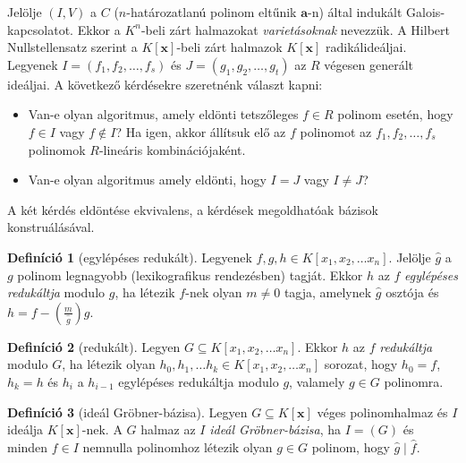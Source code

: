 \documentclass[%
	DIV=15,appendixprefix]{scrreprt}
\theoremstyle{definition}
\newtheorem*{defin}{Definíció}
\theoremstyle{remark}
\begin{document}
Jelölje $ \left( I,{} V \right) $ a $ C $ ($ n $-határozatlanú polinom eltűnik
$ \mathbf{ a } $-n) által indukált Galois-kapcsolatot. Ekkor a $ K^{ n } $-beli zárt halmazokat
\emph{varietásoknak} nevezzük. A Hilbert Nullstellensatz szerint a $ K \left[ \mathbf{ x }
\right] $-beli zárt halmazok $ K \left[ \mathbf{ x } \right] $ radikálideáljai.
%
Legyenek $ I = \left( f_{ 1 },{} f_{ 2 },{} \ldots,{} f_{ s } \right) $ és $ J = \left( g_{ 1 },{}
g_{ 2 },{} \ldots,{} g_{ t } \right) $ az $ R $ végesen generált ideáljai. A következő kérdésekre
szeretnénk választ kapni:
\begin{itemize}
	\item Van-e olyan algoritmus, amely eldönti tetszőleges $ f \in R $ polinom esetén, hogy $ f \in
		I $ vagy $ f \not\in I $? Ha igen, akkor állítsuk elő az $ f $ polinomot az $ f_{ 1 },{}
		f_{ 2 },{} \ldots,{} f_{ s }$ polinomok $ R $-lineáris kombinációjaként.
	\item Van-e olyan algoritmus amely eldönti, hogy $ I = J $ vagy $ I \neq J $?
\end{itemize}
A két kérdés eldöntése ekvivalens, a kérdések megoldhatóak  bázisok konstruálásával.
\begin{defin}[egylépéses redukált]
	Legyenek $ f,{} g,{} h \in K \left[ x_{ 1 },{} x_{ 2 },{} \ldots x_{ n } \right] $. Jelölje
	$ \hat{ g } $ a $g$ polinom legnagyobb (lexikografikus rendezésben) tagját. Ekkor $ h $ az $ f $
	\emph{egylépéses redukáltja} modulo $ g $, ha létezik $ f $-nek olyan $ m \neq 0 $ tagja,
	amelynek $ \hat{ g } $ osztója és $ h = f - \left( \frac{ m }{ \hat{ g } } \right)  g $.
\end{defin}
\begin{defin}[redukált]
	Legyen $ G \subseteq K \left[ x_{ 1 },{} x_{ 2 },{} \ldots x_{ n } \right] $. Ekkor $ h $ az
	$ f $ \emph{redukáltja} modulo $ G $, ha létezik olyan $ h_{ 0 },{} h_{ 1 },{} \ldots h_{ k }
	\in K \left[ x_{ 1 },{} x_{ 2 },{} \ldots x_{ n } \right] $ sorozat, hogy $ h_{ 0 } = f $,
	$ h_{ k } = h $ és $ h_{ i } $ a $h_{ i - 1 }$ egylépéses redukáltja modulo $ g $, valamely
	$ g \in G $ polinomra.
\end{defin}
%
\begin{defin}[ideál Gröbner-bázisa]
	Legyen $ G \subseteq K \left[ \mathbf{ x } \right] $ véges polinomhalmaz és $ I $ ideálja
	$ K \left[ \mathbf{ x } \right] $-nek. A $ G $ halmaz az $ I $ \emph{ideál Gröbner-bázisa}, ha
	$ I = \left( G \right) $ és minden $ f \in I $ nemnulla polinomhoz létezik olyan $ g \in G $
	polinom, hogy $ \hat{ g } \mid \hat{ f } $.
\end{defin}
\end{document}
